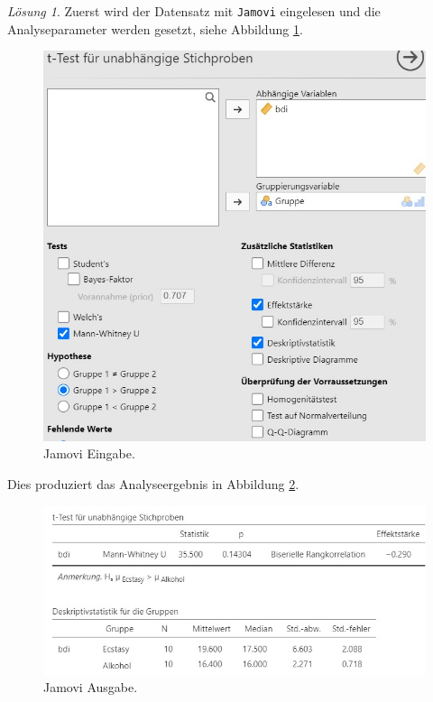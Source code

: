 \documentclass[
]{book}
\theoremstyle{definition}
\theoremstyle{definition}
\theoremstyle{definition}
\theoremstyle{definition}
\theoremstyle{remark}
\newtheorem*{solution}{Lösung}
\begin{document}
\begin{solution}

Zuerst wird der Datensatz mit \texttt{Jamovi} eingelesen und die
Analyseparameter werden gesetzt, siehe Abbildung
\ref{fig:sol-depression-ecstasy-input}.

\begin{figure}
\includegraphics[width=1\linewidth]{figures/07-exr-depression-ecstasy-jmv-input} \caption{Jamovi Eingabe.}\label{fig:sol-depression-ecstasy-input}
\end{figure}

Dies produziert das Analyseergebnis in Abbildung
\ref{fig:sol-depression-ecstasy-output}.

\begin{figure}
\includegraphics[width=1\linewidth]{figures/07-exr-depression-ecstasy-jmv-output} \caption{Jamovi Ausgabe.}\label{fig:sol-depression-ecstasy-output}
\end{figure}


\end{solution}
\end{document}
